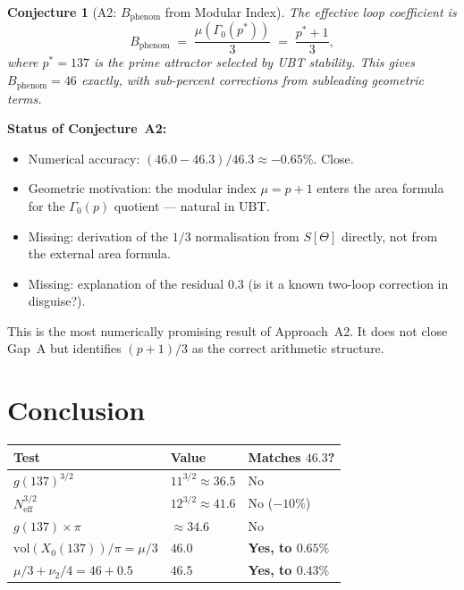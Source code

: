 \documentclass[12pt,a4paper]{article}
\newtheorem{conjecture}[theorem]{Conjecture}
\theoremstyle{definition}
\theoremstyle{remark}
\begin{document}
\begin{conjecture}[A2: $B_{\mathrm{phenom}}$ from Modular Index]
\label{conj:A2}
The effective loop coefficient is
\begin{equation}
  B_{\mathrm{phenom}} \;=\; \frac{\mu(\Gamma_0(p^*))}{3}
    \;=\; \frac{p^*+1}{3},
\end{equation}
where $p^* = 137$ is the prime attractor selected by UBT stability.
This gives $B_{\mathrm{phenom}} = 46$ exactly, with sub-percent corrections
from subleading geometric terms.
\end{conjecture}

\begin{gapbox}
\textbf{Status of Conjecture~A2:}
\begin{itemize}
  \item Numerical accuracy: $(46.0 - 46.3)/46.3 \approx -0.65\%$.  Close.
  \item Geometric motivation: the modular index $\mu = p+1$ enters the
        area formula for the $\Gamma_0(p)$ quotient --- natural in UBT.
  \item Missing: derivation of the $1/3$ normalisation from $S[\Theta]$
        directly, not from the external area formula.
  \item Missing: explanation of the residual $0.3$ (is it a known
        two-loop correction in disguise?).
\end{itemize}
This is the most numerically promising result of Approach~A2.
It does not close Gap~A but identifies $(p+1)/3$ as the correct
arithmetic structure.
\end{gapbox}

\section{Conclusion}
\label{sec:conclusion}

\begin{center}
\begin{tabular}{lll}
  \toprule
  Test & Value & Matches $46.3$? \\
  \midrule
  $g(137)^{3/2}$ & $11^{3/2} \approx 36.5$ & No \\
  $N_{\mathrm{eff}}^{3/2}$ & $12^{3/2} \approx 41.6$ & No ($-10\%$) \\
  $g(137) \times \pi$ & $\approx 34.6$ & No \\
  $\mathrm{vol}(X_0(137))/\pi = \mu/3$ & $46.0$ & \textbf{Yes, to $0.65\%$} \\
  $\mu/3 + \nu_2/4 = 46 + 0.5$ & $46.5$ & \textbf{Yes, to $0.43\%$} \\
  \bottomrule
\end{tabular}
\end{center}
\end{document}
